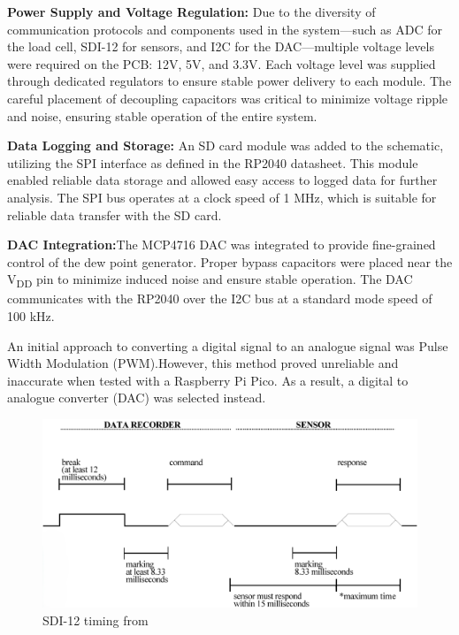 \textbf{Power Supply and Voltage Regulation:} Due to the diversity of communication protocols and components used in the system—such as ADC for the load cell, SDI-12 for sensors, and I2C for the DAC—multiple voltage levels were required on the PCB: 12V, 5V, and 3.3V. Each voltage level was supplied through dedicated regulators to ensure stable power delivery to each module. The careful placement of decoupling capacitors was critical to minimize voltage ripple and noise, ensuring stable operation of the entire system.

\textbf{Data Logging and Storage:} An SD card module was added to the schematic, utilizing the SPI interface as defined in the RP2040 datasheet. This module enabled reliable data storage and allowed easy access to logged data for further analysis. The SPI bus operates at a clock speed of 1 MHz, which is suitable for reliable data transfer with the SD card.

\textbf{DAC Integration:}The MCP4716 DAC was integrated to provide fine-grained control of the dew point generator. Proper bypass capacitors were placed near the V\textsubscript{DD} pin to minimize induced noise and ensure stable operation. The DAC communicates with the RP2040 over the I2C bus at a standard mode speed of 100 kHz.

An initial approach to converting a digital signal to an analogue signal was Pulse Width Modulation (PWM).However, this method proved unreliable and inaccurate when tested with a Raspberry Pi Pico. As a result, a digital to analogue converter (DAC) was selected instead.

\begin{figure}
    \includegraphics[width=\linewidth]{figures/SDI-12_timing.png}
    \caption{SDI-12 timing from \cite{sdi12_datasheet}}
    \label{sdi12_timing}
\end{figure}

